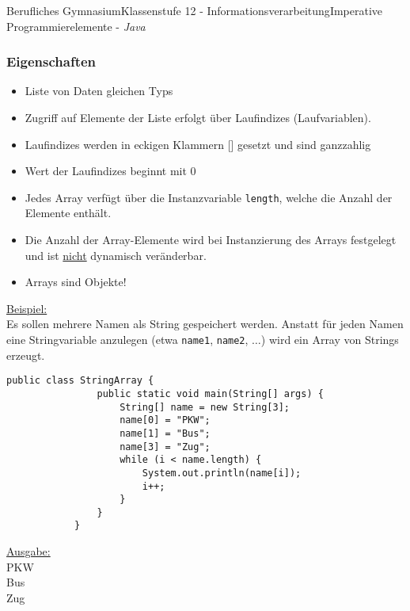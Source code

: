\documentclass[oneside,openany,headings=optiontotoc,11pt,numbers=noenddot]{article}
\begin{document}
\begin{worksheet}{Berufliches Gymnasium}{Klassenstufe 12 - Informationsverarbeitung}{Imperative Programmierelemente - \textit{Java}}
		\subsubsection{Eigenschaften}
		\begin{itemize}
			\item Liste von Daten gleichen Typs
			\item Zugriff auf Elemente der Liste erfolgt über Laufindizes (Laufvariablen).
			\item Laufindizes werden in eckigen Klammern [] gesetzt und sind ganzzahlig
			\item Wert der Laufindizes beginnt mit 0
			\item Jedes Array verfügt über die Instanzvariable \lstinline[style=JavaInputStyle]|length|, welche die Anzahl der Elemente enthält.
			\item Die Anzahl der Array-Elemente wird bei Instanzierung des Arrays festgelegt und ist \underline{nicht} dynamisch veränderbar.
			\item Arrays sind Objekte!
		\end{itemize}
		\underline{Beispiel:}\\
		Es sollen mehrere Namen als String gespeichert werden. Anstatt für jeden Namen eine Stringvariable anzulegen (etwa \lstinline[style=JavaInputStyle]|name1|, \lstinline[style=JavaInputStyle]|name2|, $\ldots$) wird ein Array von Strings erzeugt.
		\begin{lstlisting}[style=JavaInputStyle]
			public class StringArray {
				public static void main(String[] args) {
					String[] name = new String[3];
					name[0] = "PKW";
					name[1] = "Bus";
					name[3] = "Zug";
					while (i < name.length) {
						System.out.println(name[i]);
						i++;
					}
				}
			}
		\end{lstlisting}
		\underline{Ausgabe:}\\
		PKW\\
		Bus\\
		Zug

\end{worksheet}
\end{document}
